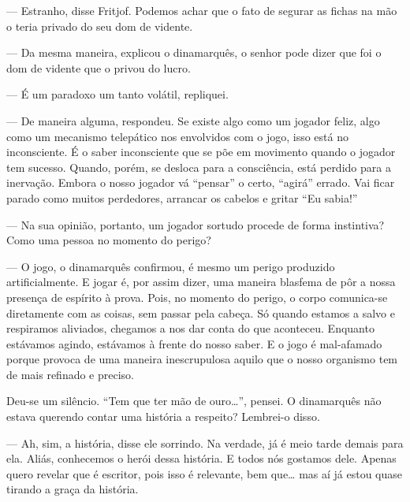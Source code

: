 --- Estranho, disse Fritjof. Podemos achar que o fato de segurar as
fichas na mão o teria privado do seu dom de vidente.

--- Da mesma maneira, explicou o dinamarquês, o senhor pode dizer que foi
o dom de vidente que o privou do lucro.

--- É um paradoxo um tanto volátil, repliquei.

--- De maneira alguma, respondeu. Se existe algo como um jogador feliz,
algo como um mecanismo telepático nos envolvidos com o jogo, isso está
no inconsciente. É o saber inconsciente que se põe em movimento quando o
jogador tem sucesso. Quando, porém, se desloca para a consciência, está
perdido para a inervação. Embora o nosso jogador vá ``pensar'' o certo,
``agirá'' errado. Vai ficar parado como muitos perdedores, arrancar os
cabelos e gritar ``Eu sabia!''

--- Na sua opinião, portanto, um jogador sortudo procede de forma
instintiva? Como uma pessoa no momento do perigo?

--- O jogo, o dinamarquês confirmou, é mesmo um perigo produzido
artificialmente. E jogar é, por assim dizer, uma maneira blasfema de pôr
a nossa presença de espírito à prova. Pois, no momento do perigo, o
corpo comunica-se diretamente com as coisas, sem passar pela cabeça. Só
quando estamos a salvo e respiramos aliviados, chegamos a nos dar conta
do que aconteceu. Enquanto estávamos agindo, estávamos à frente do nosso
saber. E o jogo é mal-afamado porque provoca de uma maneira
inescrupulosa aquilo que o nosso organismo tem de mais refinado e
preciso.

Deu-se um silêncio. ``Tem que ter mão de ouro\ldots{}'', pensei. O
dinamarquês não estava querendo contar uma história a respeito?
Lembrei-o disso.

--- Ah, sim, a história, disse ele sorrindo. Na verdade, já é meio tarde
demais para ela. Aliás, conhecemos o herói dessa história. E todos nós
gostamos dele. Apenas quero revelar que é escritor, pois isso é
relevante, bem que\ldots{} mas aí já estou quase tirando a graça da história.

